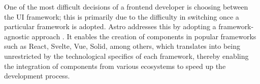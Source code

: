 One of the most difficult decisions of a frontend developer is choosing between
the UI framework; this is primarily due to the difficulty in switching once a
particular framework is adopted. Astro addresses this by adopting a
framework-agnostic approach \cite{astro}. It enables the creation of components
in popular frameworks such as React, Svelte, Vue, Solid, among others, which
translates into being unrestricted by the technological specifics of each
framework, thereby enabling the integration of components from various
ecosystems to speed up the development process.
